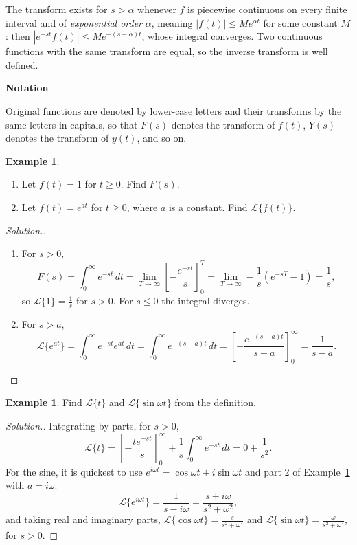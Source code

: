 \documentclass[11pt,a4paper]{article}
\theoremstyle{definition}
\newtheorem{exa}[thm]{Example}
\newenvironment{solution}
  {\renewcommand{\qedsymbol}{}\begin{proof}[\textit{Solution}.]}
  {\end{proof}}
\newcommand{\subhead}[1]{%
  \par\medskip\noindent\textbf{#1}\par\nobreak\smallskip}
\begin{document}
The transform exists for $s>\alpha$ whenever $f$ is piecewise continuous on every
finite interval and of \emph{exponential order} $\alpha$, meaning
$|f(t)|\leq Me^{\alpha t}$ for some constant $M$: then
$|e^{-st}f(t)|\leq Me^{-(s-\alpha)t}$, whose integral converges. Two continuous
functions with the same transform are equal, so the inverse transform is
well defined.

\subhead{Notation}

Original functions are denoted by lower-case letters and their transforms by the
same letters in capitals, so that $F(s)$ denotes the transform of $f(t)$, $Y(s)$
denotes the transform of $y(t)$, and so on.

\begin{exa}
\label{ex:laplacebasic}
\begin{enumerate}
\item Let $f(t) = 1$ for $t\geq 0$. Find $F(s)$.
\item Let $f(t) = e^{at}$ for $t\geq 0$, where $a$ is a constant. Find
$\mathcal{L}\{f(t)\}$.
\end{enumerate}
\end{exa}

\begin{solution}
\begin{enumerate}
\item For $s>0$,
\[F(s) = \int^{\infty}_{0} e^{-st}\,dt = \lim_{T \to \infty}\left[-\frac{e^{-st}}{s}
\right]_0^T = \lim_{T \to \infty } -\frac{1}{s}\left(e^{-sT}-1\right) =
\frac{1}{s} ,\]
so $\mathcal{L}\{1\} = \frac{1}{s}$ for $s>0$. For $s\leq 0$ the integral
diverges.

\item For $s>a$,
\[\mathcal{L}\{e^{at}\} = \int^{\infty}_0 e^{-st}e^{at}\, dt = \int^{\infty}_0
e^{-(s-a)t}\,dt = \left[-\frac{e^{-(s-a)t}}{s - a}\right]^{\infty}_0 = \frac{1}{s
- a} .\]
\end{enumerate}
\end{solution}

\begin{exa}
\label{ex:laplacet}
Find $\mathcal{L}\{t\}$ and $\mathcal{L}\{\sin\omega t\}$ from the definition.
\end{exa}

\begin{solution}
Integrating by parts, for $s>0$,
\[\mathcal{L}\{t\} = \left[-\frac{te^{-st}}{s}\right]_0^\infty +
\frac1s\int_0^\infty e^{-st}\,dt = 0 + \frac{1}{s^2} .\]
For the sine, it is quickest to use $e^{i\omega t} = \cos\omega t + i\sin\omega
t$ and part 2 of Example~\ref{ex:laplacebasic} with $a = i\omega$:
\[\mathcal{L}\{e^{i\omega t}\} = \frac{1}{s - i\omega} = \frac{s +
i\omega}{s^2 + \omega^2},\]
and taking real and imaginary parts, $\mathcal{L}\{\cos\omega t\} =
\frac{s}{s^2 + \omega^2}$ and $\mathcal{L}\{\sin\omega t\} = \frac{\omega}{s^2 +
\omega^2}$, for $s>0$.
\end{solution}
\end{document}
